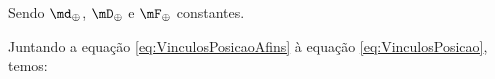 \documentclass[]{politex}
\begin{document}
Sendo $\md_{\oplus}$, $\mD_{\oplus}$ e $\mF_{\oplus}$ constantes.

Juntando a equação \eqref{eq:VinculosPosicaoAfins} à equação \eqref{eq:VinculosPosicao}, temos:
\end{document}
